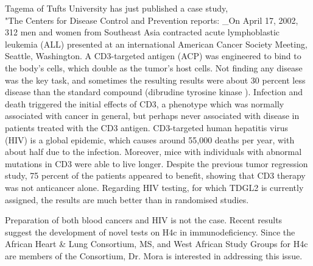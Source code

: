 \documentclass{article}
\begin{document}
Tagema of Tufts University has just published a case study, \\"The Centers for Disease Control and Prevention reports: \_On April 17, 2002, 312 men and women from Southeast Asia contracted acute lymphoblastic leukemia (ALL) presented at an international American Cancer Society Meeting, Seattle, Washington. A CD3-targeted antigen (ACP) was engineered to bind to the body’s cells, which double as the tumor’s host cells. Not finding any disease was the key task, and sometimes the resulting results were about 30 percent less disease than the standard compound (dibrudine tyrosine kinase ). Infection and death triggered the initial effects of CD3, a phenotype which was normally associated with cancer in general, but perhaps never associated with disease in patients treated with the CD3 antigen. CD3-targeted human hepatitis virus (HIV) is a global epidemic, which causes around 55,000 deaths per year, with about half due to the infection. Moreover, mice with individuals with abnormal mutations in CD3 were able to live longer. Despite the previous tumor regression study, 75 percent of the patients appeared to benefit, showing that CD3 therapy was not anticancer alone. Regarding HIV testing, for which TDGL2 is currently assigned, the results are much better than in randomised studies.

Preparation of both blood cancers and HIV is not the case. Recent results suggest the development of novel tests on H4c in immunodeficiency. Since the African Heart \& Lung Consortium, MS, and West African Study Groups for H4c are members of the Consortium, Dr. Mora is interested in addressing this issue.
\end{document}
